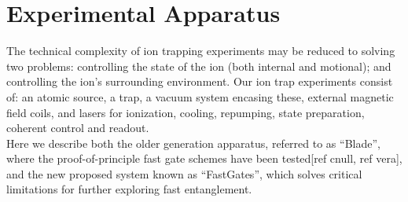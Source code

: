 \documentclass[12pt]{iopart}
\begin{document}


\section{Experimental Apparatus}

The technical complexity of ion trapping experiments may be reduced to
solving two problems: controlling the state of the ion (both internal
and motional); and controlling the ion's surrounding environment.
Our ion trap experiments consist of: an atomic source, a trap, a
vacuum system encasing these, external magnetic field coils, and
lasers for ionization, cooling, repumping, state preparation, coherent
control and readout.\\
Here we describe both the older generation apparatus, referred to as ``Blade'',
where the proof-of-principle fast gate schemes have been tested[ref
  cnull, ref vera], and the new proposed system known as
``FastGates'', which solves critical limitations for further exploring
fast entanglement.
\end{document}
